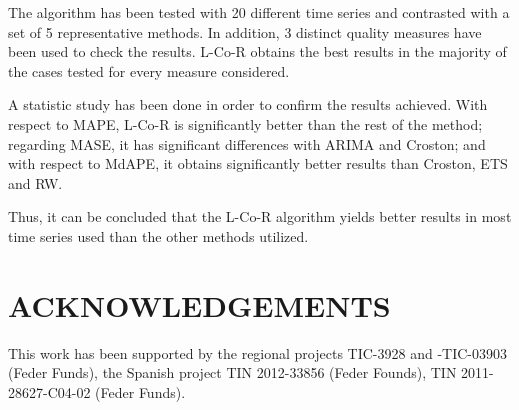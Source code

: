 \documentclass[a4paper,twoside]{article}
\newcommand{\metodo}{L-Co-R}
\begin{document}
The algorithm has been tested with 20 different time series and
contrasted with a set of 5 representative methods. In
addition, 3 distinct quality measures have been
used to check the results. {\metodo} obtains the best results in the
majority of the cases tested for every measure considered.

A statistic study has been done in order to confirm the results achieved.
With respect to MAPE, {\metodo} is significantly better than the rest
of the method; regarding MASE, it has significant differences
with ARIMA and Croston; and with respect to MdAPE, it obtains
significantly better results than Croston, ETS and RW. 

Thus, it can be concluded that the {\metodo} algorithm yields better
results in most time series used than the other methods utilized. 
\section*{\uppercase{Acknowledgements}}

\noindent This work has been supported by the regional projects
TIC-3928 and -TIC-03903 (Feder Funds), the Spanish project TIN
2012-33856 (Feder Founds), TIN 2011-28627-C04-02 (Feder Funds). 




{\small
}




\vfill
\end{document}
